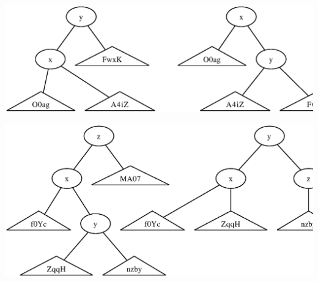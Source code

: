 \documentclass[english]{article}
\begin{document}

\includegraphics[scale=.5]{kap3Rotation1.la.dot.ps}


\includegraphics[scale=.5]{kap3Rotation2.la.dot.ps}
\end{document}
